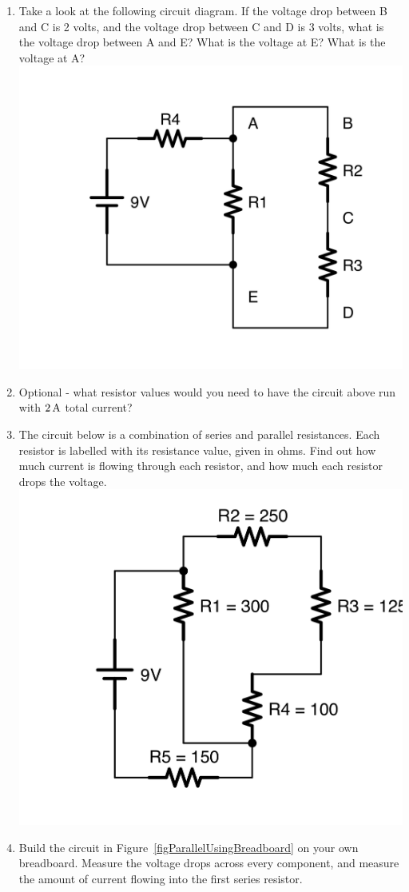 \begin{enumerate}
\item Take a look at the following circuit diagram.  If the voltage drop between B and C is 2 volts, and the voltage drop between C and D is 3 volts, what is the voltage drop between A and E?  What is the voltage at E?  What is the voltage at A? \\ \includegraphics[scale=0.08]{VoltageDropProblem.png}
\item Optional - what resistor values would you need to have the circuit above run with $2\,\si{\ampere}$ total current?
\item The circuit below is a combination of series and parallel resistances.  Each resistor is labelled with its resistance value, given in ohms.  Find out how much current is flowing through each resistor, and how much each resistor drops the voltage.  \\ \includegraphics[scale=0.08]{ProblemCalculateCurrentAndVoltage.png}
\item Build the circuit in Figure~\ref{figParallelUsingBreadboard} on your own breadboard.  Measure the voltage drops across every component, and measure the amount of current flowing into the first series resistor.
\end{enumerate}
